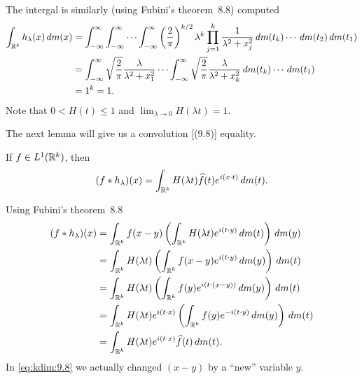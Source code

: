 \begin{enumerate}
The intergal is similarly (using Fubini's theorem~8.8) computed
\begin{align}
\int_{\mathbb{R}^k}h_\lambda(x)\,dm(x)
&=  \int_{-\infty}^\infty
    \int_{-\infty}^\infty
    \cdots
    \int_{-\infty}^\infty
     \left(\frac{2}{\pi}\right)^{k/2} \lambda^k 
       \prod_{j=1}^k \frac{1}{\lambda^2+x_j^2}
    \,dm(t_k) 
     \cdots
    \,dm(t_2) 
    \,dm(t_1) 
    \notag \\
&=  \int_{-\infty}^\infty
      \sqrt{\frac{2}{\pi}}\frac{\lambda}{\lambda^2+x_1^2}
    \cdots
    \int_{-\infty}^\infty
      \sqrt{\frac{2}{\pi}}\frac{\lambda}{\lambda^2+x_k^2}
    \,dm(t_k) 
     \cdots
    \,dm(t_1) 
    \notag \\
&= 1^k = 1. \label{eq:kdim:9.7(4)}
\end{align}
Note that \(0<H(t)\leq 1\) and \(\lim_{\lambda\to 0} H(\lambda t) = 1\).

The next lemma will give us a convolution [(9.8)] equality.
\begin{llem} \label{lem:9.8:kdim}
If \(f\in L^1(\mathbb{R}^k)\), then
\begin{equation} \label{eq:9.8:kdim}
(f\ast h_\lambda)(x) 
= \int_{\mathbb{R}^k} H(\lambda t) \widehat{f}(t)e^{i(x\cdot t)}\,dm(t).
\end{equation}
\end{llem}
\begin{thmproof}
Using Fubini's theorem~8.8
\begin{align}
(f\ast h_\lambda)(x) 
&= \int_{\mathbb{R}^k} f(x-y)
     \left(\int_{\mathbb{R}^k} H(\lambda t)e^{i(t\cdot y)}\,dm(t)\right)\,dm(y) 
     \notag \\
&= \int_{\mathbb{R}^k} H(\lambda t)
     \left(\int_{\mathbb{R}^k} f(x-y)e^{i(t\cdot y)}\,dm(y)\right)\,dm(t)
     \notag \\
&= \int_{\mathbb{R}^k} H(\lambda t)
     \left(\int_{\mathbb{R}^k} f(y)e^{i(t\cdot (x-y))}\,dm(y)\right)\,dm(t)
     \label{eq:kdim:9.8}
     \notag \\
&= \int_{\mathbb{R}^k} H(\lambda t)e^{i(t\cdot x)}
     \left(\int_{\mathbb{R}^k} f(y)e^{-i(t\cdot y)}\,dm(y)\right)\,dm(t)
     \notag \\
&= \int_{\mathbb{R}^k} H(\lambda t)e^{i(t\cdot x)}\widehat{f}(t)\,dm(t).
\end{align}
In \eqref{eq:kdim:9.8} we actually changed \((x-y)\)
by a ``new'' variable $y$.
\end{thmproof}


\end{enumerate}
